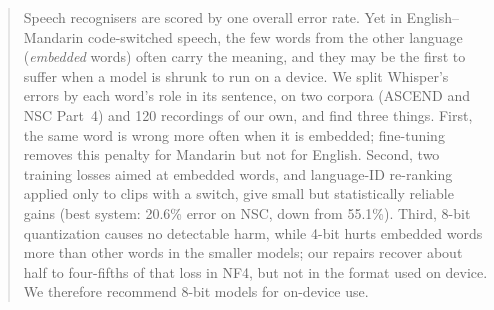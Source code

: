 \begin{abstract}
Speech recognisers are scored by one overall error rate. Yet in English--Mandarin code-switched speech, the few words from the other language (\emph{embedded} words) often carry the meaning, and they may be the first to suffer when a model is shrunk to run on a device. We split Whisper's errors by each word's role in its sentence, on two corpora (ASCEND and NSC Part~4) and 120 recordings of our own, and find three things. First, the same word is wrong more often when it is embedded; fine-tuning removes this penalty for Mandarin but not for English. Second, two training losses aimed at embedded words, and language-ID re-ranking applied only to clips with a switch, give small but statistically reliable gains (best system: 20.6\% error on NSC, down from 55.1\%). Third, 8-bit quantization causes no detectable harm, while 4-bit hurts embedded words more than other words in the smaller models; our repairs recover about half to four-fifths of that loss in NF4, but not in the format used on device. We therefore recommend 8-bit models for on-device use.
\end{abstract}
